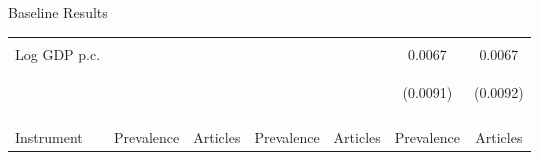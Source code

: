 \documentclass[11pt]{beamer}
\begin{document}
\begin{frame}{Baseline Results}
\begin{table}[htbp]
{\begin{tabular}{lcccccc}
\vspace{4pt} & \begin{footnotesize}\end{footnotesize} & \begin{footnotesize}\end{footnotesize} & \begin{footnotesize}\end{footnotesize} & \begin{footnotesize}\end{footnotesize} & \begin{footnotesize}\end{footnotesize} & \begin{footnotesize}\end{footnotesize} \\
Log GDP p.c. &  &  & &  & 0.0067 & 0.0067 \\
 & \begin{footnotesize} \end{footnotesize} & \begin{footnotesize} \end{footnotesize} & \begin{footnotesize} \end{footnotesize} & \begin{footnotesize} \end{footnotesize} & \begin{footnotesize}(0.0091)\end{footnotesize} & \begin{footnotesize}(0.0092)\end{footnotesize} \\
\vspace{4pt} & \begin{footnotesize}\end{footnotesize} & \begin{footnotesize}\end{footnotesize} & \begin{footnotesize}\end{footnotesize} & \begin{footnotesize}\end{footnotesize} & \begin{footnotesize}\end{footnotesize} & \begin{footnotesize}\end{footnotesize} \\
Instrument & Prevalence & Articles & Prevalence & Articles & Prevalence & Articles \\

\end{tabular}}
\end{table}
\end{frame}
\end{document}
